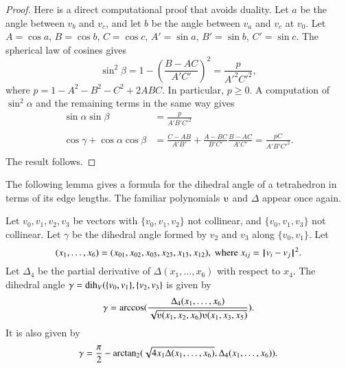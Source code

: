 \begin{proof}  
Here is a direct
computational proof that avoids duality.
Let $a$ be the angle between $v_b$ and $v_c$, and let $b$ be the angle
between $v_a$ and $v_c$ at $v_0$.
Let $A=\cos a$, $B=\cos b$, $C=\cos c$,
$A'=\sin a$, $B'=\sin b$, $C'=\sin c$.  The
spherical law of cosines gives
   $$\sin^2\beta = 1-\left(\frac{B-A C}{A' C'}\right)^2
     = \frac{p}{A'^2 C'^2},$$
where $p=1-A^2 - B^2 - C^2 + 2 A B C$.
In particular, $p\ge 0$.
A computation of $\sin^2\alpha$ and the remaining terms in the same way gives
   $$
   \begin{array}{lll}
     \sin\alpha\sin\beta &= \frac{p}{A' B' C'^2}\\ 
      \\
     \cos\gamma + \cos\alpha \cos\beta &=
         \frac{C - A B}{A' B'} + \frac{A - B C}{B' C'} \frac{B - A C}{A' C'}
         = \frac{p C}{A' B' C'^2}.\\
   \end{array}
   $$
The result follows.
\end{proof}

The following lemma gives a formula for the dihedral angle
of a tetrahedron in terms of its edge lengths.  The
familiar polynomials $\ups$ and $\Delta$ appear once again.


\begin{lemma} \label{lemma:dihform}
Let $v_0,v_1,v_2,v_3$ 
be vectors with $\{v_0,v_1,v_2\}$ not collinear, 
and $\{v_0,v_1,v_3\}$ not
collinear. 
Let $\gamma$ be the dihedral angle formed
by $v_2$ and $v_3$ along $\{v_0,v_1\}$. Let
    $$(x_1,\ldots,x_6) = 
    (x_{01},x_{02},x_{03},x_{23},x_{13},x_{12}),
    \text{ where } x_{ij}={\hskip0.1em|\hskip-0.15em|\hskip0.1em}v_i - v_j{\hskip0.1em|\hskip-0.15em|\hskip0.1em}^2.$$
Let $\Delta_4$ be the partial derivative of $\Delta(x_1,\ldots,x_6)$ with
respect to $x_4$.
The dihedral angle $\gamma=\operatorname{dih}_V(\{v_0,v_1\},\{v_2,v_3\}$
is given by
    $$
    \gamma=\arccos(\frac{\Delta_4(x_1,\ldots,x_6)}{\sqrt{
    \ups(x_1,x_2,x_6)\ups(x_1,x_3,x_5)}}).
    $$
It is also given by
    $$
    \gamma=\frac{\pi}{2} - {\operatorname{arctan_2}}
     ({\sqrt{4 x_1 \Delta(x_1,\ldots,x_6)}},{\Delta_4(x_1,\ldots,x_6)}).
    $$
\end{lemma}


